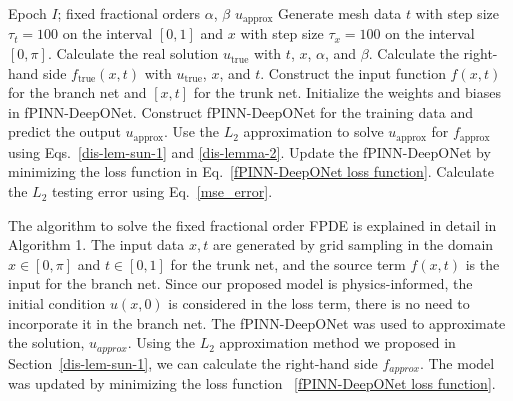\documentclass[11pt]{article}
\providecommand{\bh}[1]{#1}
\begin{document}
\begin{algorithm}[H]
\caption{Solving fixed fractional-order FPDE using fPINN-DeepONet}
\label{alg:fixed-fpde}
\begin{algorithmic}[1]
\Require Epoch $I$; fixed fractional orders $\alpha$, $\beta$
\Ensure $u_{\mathrm{approx}}$
\State Generate mesh data $t$ with step size $\tau_t=100$ on the interval $[0,1]$ and $x$ with step size $\tau_x=100$ on the interval $[0,\pi]$.
\State Calculate the real solution $u_{\mathrm{true}}$ with $t$, $x$, $\alpha$, and $\beta$.
\State Calculate the right-hand side $f_{\mathrm{true}}(x,t)$ with $u_{\mathrm{true}}$, $x$, and $t$.
\State Construct the input function $f(x,t)$ for the branch net and $[x,t]$ for the trunk net.
\State Initialize the weights and biases in fPINN-DeepONet.
    \State Construct fPINN-DeepONet for the training data and predict the output $u_{\mathrm{approx}}$.
    \State Use the $L_2$ approximation to solve $u_{\mathrm{approx}}$ for $f_{\mathrm{approx}}$ using Eqs.~\eqref{dis-lem-sun-1} and \eqref{dis-lemma-2}.
    \State Update the fPINN-DeepONet by minimizing the loss function in Eq.~\eqref{fPINN-DeepONet loss function}.
\EndFor
\State Calculate the $L_2$ testing error using Eq.~\eqref{mse_error}.
\end{algorithmic}
\end{algorithm}

The algorithm to solve the fixed fractional order FPDE is explained in detail in Algorithm 1. The input data $x,t$ are generated by grid sampling in the domain $x\in [0,\pi]$ and $t \in [0,1]$ for the trunk net, and the source term $f(x,t)$ is the input for the branch net. Since our proposed model is physics-informed, the initial condition $u(x,0)$ is considered in the loss term, there is no need to incorporate it in the branch net. The fPINN-DeepONet was used to approximate the solution, $u_{approx}$. Using the $L_2$ approximation method we proposed in \bh{Section~\ref{dis-lem-sun-1}}, we can calculate the right-hand side $f_{approx}$. The model was updated by minimizing the loss function ~\ref{fPINN-DeepONet loss function}.
\end{document}
